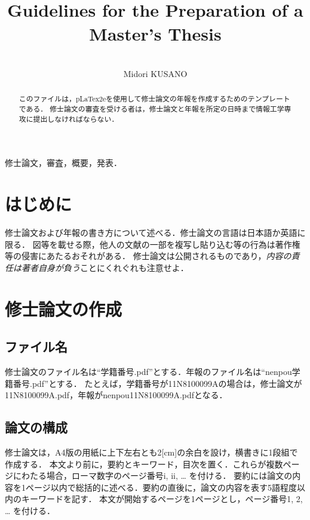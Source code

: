 \documentclass[10pt,a4paper,notitlepage,oneside,twocolumn]{abst_ltjsarticle}
\title{
\textbf{\textgt{修士論文作成の手引き}}\\
\textmd{\textsf{Guidelines for the Preparation of a Master's Thesis}}\\
}
\author{
{\large \textbf{\textgt{情報工学専攻　草野 みどり}}}\\
{\large \textsf{Midori KUSANO}}
}
\date{}
\begin{document}
\maketitle
\thispagestyle{firstpage}

\begin{abstract}
このファイルは，pLaTex2eを使用して修士論文の年報を作成するためのテンプレートである．
修士論文の審査を受ける者は，修士論文と年報を所定の日時まで情報工学専攻に提出しなければならない．
\end{abstract}


\vspace{1\zw} \noindent
\textbf{} 
修士論文，審査，概要，発表．


\section{はじめに} \label{sec:section1}

修士論文および年報の書き方について述べる．修士論文の言語は日本語か英語に限る．
図等を載せる際，他人の文献の一部を複写し貼り込む等の行為は著作権等の侵害にあたるおそれがある．
修士論文は公開されるものであり，{\em 内容の責任は著者自身が負う}ことにくれぐれも注意せよ．


\section{修士論文の作成} \label{sec:section2}

\subsection{ファイル名} \label{subsec:section2}

修士論文のファイル名は“学籍番号.pdf”とする．年報のファイル名は“nenpou学籍番号.pdf”とする．
たとえば，学籍番号が11N8100099Aの場合は，修士論文が11N8100099A.pdf，年報がnenpou11N8100099A.pdfとなる．


\subsection{論文の構成} \label{subsec:section21}

修士論文は，A4版の用紙に上下左右とも2[cm]の余白を設け，横書きに1段組で作成する．
本文より前に，要約とキーワード，目次を置く．これらが複数ページにわたる場合，ローマ数字のページ番号i, ii, … を付ける．
要約には論文の内容を1ページ以内で総括的に述べる．要約の直後に，論文の内容を表す5語程度以内のキーワードを記す．
本文が開始するページを1ページとし，ページ番号1, 2, … を付ける．
\end{document}
